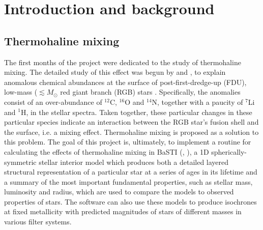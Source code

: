 \documentclass[12pt, a4paper]{report}
\begin{document}
\chapter{Introduction and background}

\section{Thermohaline mixing} \label{intro_thl}
The first months of the project were dedicated to the study of thermohaline mixing. The detailed study of this effect was begun by \cite{1972ApJ...172..165U} and \cite{1980A&A....91..175K}, to explain anomalous chemical abundances at the surface of post-first-dredge-up (FDU), low-mass ($\lesssim M_{\odot}$ red giant branch (RGB) stars \cite{2010A&A...521A...9C}. Specifically, the anomalies consist of an over-abundance of $^{12}$C, $^{16}$O and $^{14}$N, together with a paucity of $^{7}$Li and $^{1}$H, in the stellar spectra. Taken together, these particular changes in these particular species indicate an interaction between the RGB star's fusion shell and the surface, i.e. a mixing effect. Thermohaline mixing is proposed as a solution to this problem. The goal of this project is, ultimately, to implement a routine for calculating  the effects of thermohaline mixing in BaSTI (\cite{2004ApJ...612..168P}, \cite{2008ASPC..394..285P}), a 1D spherically-symmetric stellar interior model which produces both a detailed layered structural representation of a particular star at a series of ages in its lifetime and a summary of the most important fundamental properties, such as stellar mass, luminosity and radius, which are used to compare the models to observed properties of stars. The software can also use these models to produce isochrones at fixed metallicity \citep{2013A&A...558A..46P} with predicted magnitudes of stars of different masses in various filter systems.
\end{document}
